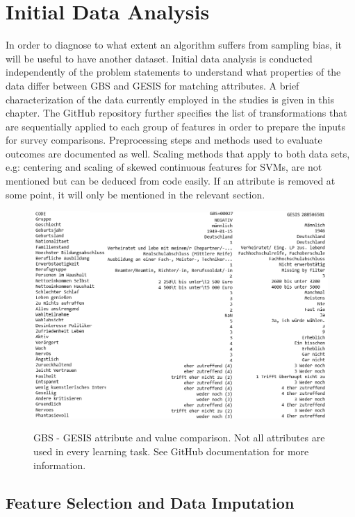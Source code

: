 \chapter{Initial Data Analysis}\label{Sec:Initial Data Analysis}

In order to diagnose to what extent an algorithm suffers from sampling bias, it will be useful to have another dataset. Initial data analysis is conducted independently of the problem statements to understand what properties of the data differ between GBS and GESIS for matching attributes. A brief characterization of the data currently employed in the studies is given in this chapter. The GitHub repository further specifies the list of transformations that are sequentially applied to each group of features in order to prepare the inputs for survey comparisons. Preprocessing steps and methods used to evaluate outcomes are documented as well. Scaling methods that apply to both data sets, e.g: centering and scaling of skewed continuous features for SVMs, are not mentioned but can be deduced from code easily. If an attribute is removed at some point, it will only be mentioned in the relevant section.

\begin{figure}[ht]
	\begin{center}
		\includegraphics[scale=0.52,angle=0]{fig/values_compare}
		\label{std}
		\caption{GBS - GESIS attribute and value comparison. Not all attributes are used in every learning task. See GitHub documentation for more information.}
	\end{center}
\end{figure}

\section{Feature Selection and Data Imputation}

